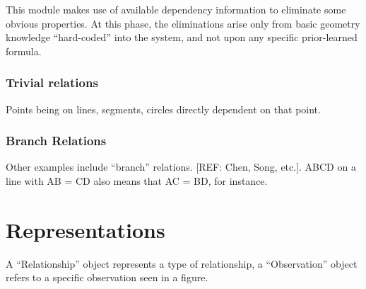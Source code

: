 This module makes use of available dependency information to eliminate
some obvious properties. At this phase, the eliminations arise only
from basic geometry knowledge ``hard-coded'' into the system, and not
upon any specific prior-learned formula.

\subsubsection{Trivial relations}

Points being on lines, segments, circles directly dependent on that point.

\subsubsection{Branch Relations}

Other examples include ``branch'' relations. [REF: Chen, Song,
  etc.]. ABCD on a line with AB = CD also means that AC = BD, for instance.

\section{Representations}

A ``Relationship'' object represents a type of relationship, a
``Observation'' object refers to a specific observation seen in a
figure.

\fi
